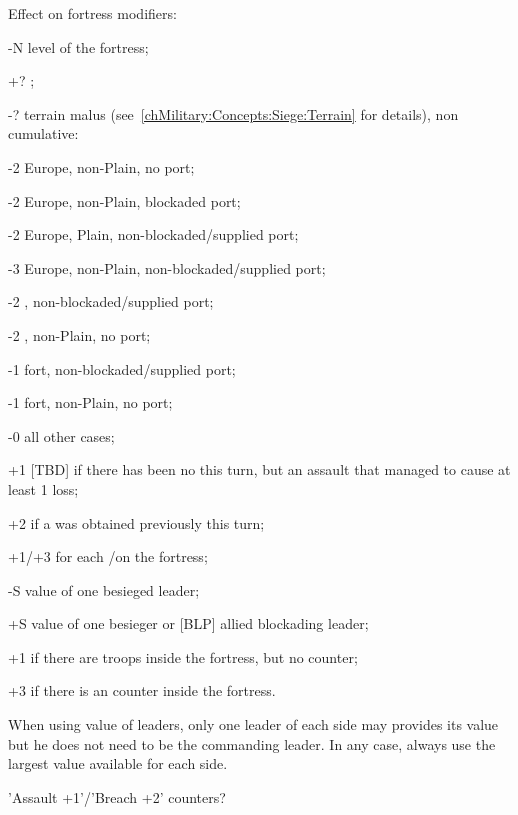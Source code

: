 
Effect on fortress modifiers:
\begin{modlist}
\item[-N] level of the fortress;
\item[+?] ;
\item[-?] terrain malus (see~\ref{chMilitary:Concepts:Siege:Terrain} for
  details), non cumulative:
  \begin{modlisti}
  \item[-2] Europe, non-Plain, no port;
  \item[-2] Europe, non-Plain, blockaded port;
  \item[-2] Europe, Plain, non-blockaded/supplied port;
  \item[-3] Europe, non-Plain, non-blockaded/supplied port;
  \item[-2] \ROTW, non-blockaded/supplied port;
  \item[-2] \ROTW, non-Plain, no port;
  \item[-1] fort, non-blockaded/supplied port;
  \item[-1] fort, non-Plain, no port;
  \item[-0] all other cases;
  \end{modlisti}
\item[+1] [TBD] if there has been no  this turn, but an assault
  that managed to cause at least 1 loss; %
\item[+2] if a  was obtained previously this turn;
\item[+1/+3] for each \USURE\facemoins/\faceplus on the fortress;
\item[-S]  value of one besieged leader;
\item[+S]  value of one besieger or [BLP] allied blockading
  leader;
\item[+1] if there are troops inside the fortress, but no \ARMY counter;
\item[+3] if there is an \ARMY counter inside the fortress.
\end{modlist}

When using  value of leaders, only one leader of each side may
provides its value but he does not need to be the commanding leader. In any
case, always use the largest  value available for each side.

\begin{todo}
  'Assault +1'/'Breach +2' counters?
\end{todo}

